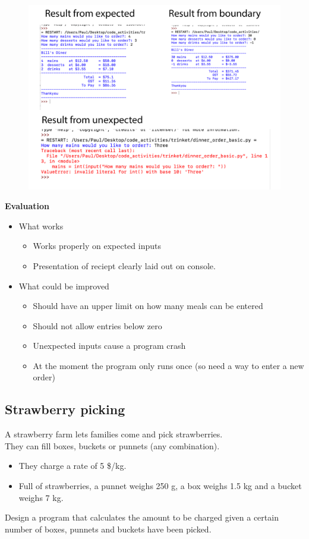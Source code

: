 \documentclass[a4paper,12pt]{article}
\begin{document}
\begin{figure} [!h]
	\centering
	\includegraphics[width=16cm]{iterative_processes/Testing.png}
\end{figure}
\newpage
\textbf{Evaluation}
\begin{itemize}
	\item What works 
\begin{itemize}
	\item Works properly on expected inputs
	\item Presentation of reciept clearly laid out on console.
\end{itemize}
	\item What could be improved
\begin{itemize}
	\item Should have an upper limit on how many meals can be entered
	\item Should not allow entries below zero
	\item Unexpected inputs cause a program crash
	\item At the moment the program only runs once (so need a way to enter a new order)
\end{itemize}
\end{itemize}
\newpage







\newpage
\subsection{Strawberry picking}

A strawberry farm lets families come and pick strawberries. \\
They can fill boxes, buckets or punnets (any combination).\\
\begin{itemize}
	\item They charge a rate of 5 \$/kg. 
	\item Full of strawberries, a punnet weighs 250 g, a box weighs 1.5 kg and a bucket weighs 7 kg.
\end{itemize}
Design a program that calculates the amount to be charged given a certain number of boxes, punnets and buckets have been picked.
\end{document}
